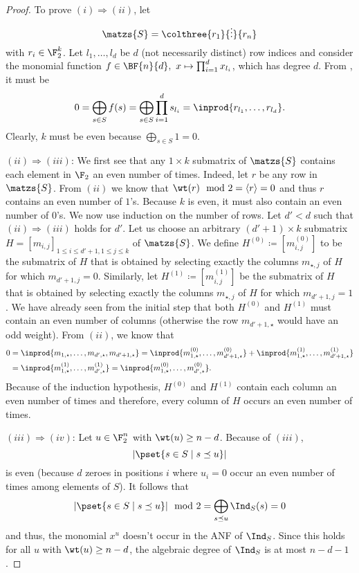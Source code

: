 \begin{proof}
To prove $(i) \Rightarrow (ii)$, let 
$$
\matzs{S} = \colthree{r_1}{\vdots}{r_n}
$$
with $r_i \in \F_2^{k}$. Let $l_1,\dots,l_d$ be $d$ (not necessarily distinct) row indices and consider the monomial function $f \in \BF{n}{d}, \ x \mapsto \prod_{i=1}^{d}x_{l_i}$, which has degree $d$. From , it must be
$$
0
= \bigoplus_{s \in S} f(s)
= \bigoplus_{s \in S} \prod_{i=1}^{d} s_{l_i}
= \inprod{ r_{l_1},\dots,r_{l_d}}.
$$
Clearly, $k$ must be even because $\bigoplus_{s \in S} 1 = 0$.

$(ii) \Rightarrow (iii)$: We first see that any $1 \times k$ submatrix of $\matzs{S}$ contains each element in $\F_2$ an even number of times. Indeed, let $r$ be any row in $\matzs{S}$. From $(ii)$ we know that $\wt(r) \mod 2 = \langle r \rangle = 0$ and thus $r$ contains an even number of $1$'s. Because $k$ is even, it must also contain an even number of $0$'s. We now use induction on the number of rows. Let $d' < d$ such that $(ii) \Rightarrow (iii)$ holds for $d'$. Let us choose an arbitrary $(d'+1) \times k$ submatrix $H = [m_{i,j}]_{1\leq i \leq d'+1, 1 \leq j \leq k}$ of $\matzs{S}$. We define $H^{(0)} \coloneqq [m^{(0)}_{i,j}]$ to be the submatrix of $H$ that is obtained by selecting exactly the columns $m_{\star,j}$ of $H$ for which $m_{d'+1,j} = 0$. Similarly, let $H^{(1)} \coloneqq [m^{(1)}_{i,j}]$ be the submatrix of $H$ that is obtained by selecting exactly the columns $m_{\star,j}$ of $H$ for which $m_{d'+1,j} = 1$. We have already seen from the initial step that both $H^{(0)}$ and $H^{(1)}$ must contain an even number of columns (otherwise the row $m_{d'+1,\star}$ would have an odd weight). From $(ii)$, we know that 
\begin{align*}
    0 &= \inprod{ m_{1,\star},\dots,m_{d',\star},m_{d'+1,\star} } =
    \inprod{ m^{(0)}_{1,\star},\dots,m^{(0)}_{d'+1,\star} } + \inprod{ m^{(1)}_{1,\star},\dots,m^{(1)}_{d'+1,\star} } \\
    &= \inprod{ m^{(1)}_{1,\star},\dots,m^{(1)}_{d',\star} } = \inprod{ m^{(0)}_{1,\star},\dots,m^{(0)}_{d',\star} }.
\end{align*}
Because of the induction hypothesis, $H^{(0)}$ and $H^{(1)}$ contain each column an even number of times and therefore, every column of $H$ occurs an even number of times.

$(iii) \Rightarrow (iv)$: Let $u \in \F_2^n$ with $\wt(u) \geq n-d$. Because of $(iii)$,
$$
|\pset{s \in S \mid s \preceq u}|
$$
is even (because $d$ zeroes in positions $i$ where $u_i = 0$ occur an even number of times among elements of $S$). It follows that 
$$
|\pset{s \in S \mid s \preceq u}| \mod 2 = \bigoplus_{s \preceq u}\Ind_S(s) = 0
$$
and thus, the monomial $x^u$ doesn't occur in the ANF of $\Ind_S$. Since this holds for all $u$ with $\wt(u) \geq n-d$, the algebraic degree of $\Ind_S$ is at most $n-d-1$.



\end{proof}
